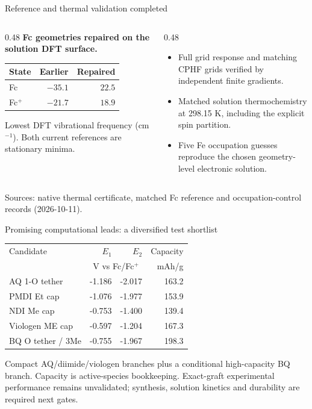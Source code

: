 \begin{frame}{Reference and thermal validation completed}
\begin{columns}[T]\begin{column}{0.48\textwidth}
\textbf{Fc geometries repaired on the solution DFT surface.}
\begin{table}\begin{tabular}{lrr}\toprule
State & Earlier & Repaired \\ \midrule
Fc & $-35.1$ & $22.5$ \\
Fc$^+$ & $-21.7$ & $18.9$ \\
\bottomrule\end{tabular}\end{table}
\scriptsize Lowest DFT vibrational frequency (cm$^{-1}$). Both current references are stationary minima.
\end{column}\begin{column}{0.48\textwidth}\begin{itemize}
\item Full grid response and matching CPHF grids verified by independent finite gradients.
\item Matched solution thermochemistry at 298.15 K, including the explicit spin partition.
\item Five Fe occupation guesses reproduce the chosen geometry-level electronic solution.
\end{itemize}\end{column}\end{columns}
\vfill\scriptsize Sources: native thermal certificate, matched Fc reference and occupation-control records (2026-10-11).
\end{frame}
\begin{frame}{Promising computational leads: a diversified test shortlist}
\small\renewcommand{\arraystretch}{1.25}
\centering\begin{tabular}{@{}lrrr@{}}\toprule
Candidate & $E_1$ & $E_2$ & Capacity \\
& \multicolumn{2}{c}{V vs Fc/Fc$^+$} & mAh/g \\ \midrule
AQ 1-O tether & -1.186 & -2.017 & 163.2 \\
PMDI Et cap & -1.076 & -1.977 & 153.9 \\
NDI Me cap & -0.753 & -1.400 & 139.4 \\
Viologen ME cap & -0.597 & -1.204 & 167.3 \\
BQ O tether / 3Me & -0.755 & -1.967 & 198.3 \\
\bottomrule\end{tabular}\par
\vspace{1ex}\raggedright
\footnotesize Compact AQ/diimide/viologen branches plus a conditional high-capacity BQ branch. Capacity is active-species bookkeeping.
\vfill\scriptsize Exact-graft experimental performance remains unvalidated; synthesis, solution kinetics and durability are required next gates.
\end{frame}
